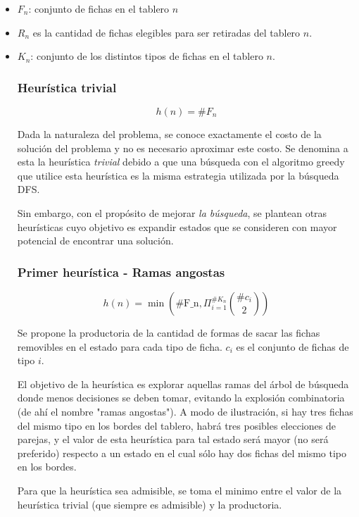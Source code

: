 \documentclass[a4paper,10pt]{article}
\begin{document}
    \begin{itemize}
        \item $F_n$: conjunto de fichas en el tablero $n$
        \item $R_n$ es la cantidad de fichas elegibles para ser retiradas del tablero $n$.
        \item $K_n$: conjunto de los distintos tipos de fichas en el tablero $n$.

    \subsubsection{Heurística trivial}

    \[ h(n) = \# F_n \]

    Dada la naturaleza del problema, se conoce exactamente el costo de la solución del problema y no es necesario aproximar este costo. Se denomina a esta la heurística \textit{trivial} debido a que una búsqueda con el algoritmo greedy que utilice esta heurística es la misma estrategia utilizada por la búsqueda DFS.

    Sin embargo, con el propósito de mejorar \textit{la búsqueda}, se plantean otras heurísticas cuyo objetivo es expandir estados que se consideren con mayor potencial de encontrar una solución.

    \subsubsection{Primer heurística - Ramas angostas}
        
    \[ h(n) = \min \left (\text{\# F_n}, \Pi_{i=1}^{\# K_n} {\# c_i \choose 2} \right )\]

    Se propone la productoria de la cantidad de formas de sacar las fichas removibles en el estado para cada tipo de ficha. $c_i$ es el conjunto de fichas de tipo $i$.

    El objetivo de la heurística es explorar aquellas ramas del árbol de búsqueda donde menos decisiones se deben tomar, evitando la explosión combinatoria (de ahí el nombre "ramas angostas"). A modo de ilustración, si hay tres fichas del mismo tipo en los bordes del tablero, habrá tres posibles elecciones de parejas, y el valor de esta heurística para tal estado será mayor (no será preferido) respecto a un estado en el cual sólo hay dos fichas del mismo tipo en los bordes.

    Para que la heurística sea admisible, se toma el minimo entre el valor de la heurística trivial (que siempre es admisible) y la productoria.
    

\end{itemize}
\end{document}
